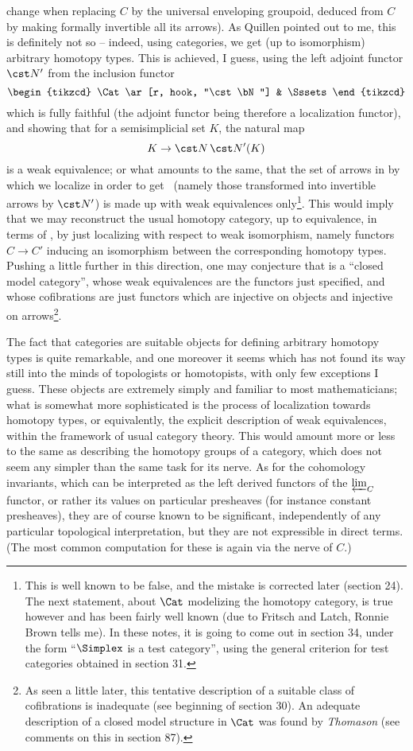 change when replacing $C$ by the universal enveloping groupoid,
deduced from $C$ by making formally invertible all its arrows).
As Quillen pointed out to me, this is definitely not so -- indeed,
using categories, we get (up to isomorphism) arbitrary homotopy
types. This is achieved, I guess, using the left adjoint functor $\cst
N'$ from the inclusion functor
\[ \begin{tikzcd} \Cat \ar[r, hook, "\cst \bN"] & \Sssets\end{tikzcd}\]
which is fully faithful (the adjoint functor being therefore a
localization functor), and showing that for a semisimplicial set $K$,
the natural map
\[ K \to \cst N\,\cst N' (K) \]
is a weak equivalence; or what amounts to the same, that the set of
arrows in \Sssets{} by which we localize in order to get \Cat\ (namely
those transformed into invertible arrows by $\cst N'$) is made up with
weak equivalences only\footnote{This is well known to be false, and the mistake is corrected later (section 24). The next statement, about $\Cat$ modelizing the homotopy category, is true however and has been fairly well known (due to Fritsch and Latch, Ronnie Brown tells me). In these notes, it is going to come out in section 34, under the form ``$\Simplex$ is a test category'', using the general criterion for test categories obtained in section 31.}. This would imply
that we may reconstruct the usual homotopy category, up to
equivalence, in terms of \Cat, by just localizing \Cat{}
with respect to weak isomorphism, namely functors $C \to C'$ inducing
an isomorphism between the corresponding homotopy types. Pushing a
little further in this direction, one may conjecture that \Cat{} is a
``closed model category'', whose weak equivalences are the functors
just specified, and whose cofibrations are just functors which are
injective on objects and injective on arrows\footnote{As seen a little later, this tentative description of a suitable class of cofibrations is inadequate (see beginning of section 30). An adequate description of a closed model structure in $\Cat$ was found by \emph{Thomason} (see comments on this in section 87).}.

The fact that categories are suitable objects for defining arbitrary homotopy types is quite remarkable, and one moreover it seems which has
not found its way still into the minds of topologists or homotopists,
with only few exceptions I guess. These objects are extremely simply
and familiar to most mathematicians; what is somewhat more
sophisticated is the process of localization towards homotopy types,
or equivalently, the explicit description of weak equivalences, within
the framework of usual category theory. This would amount more or less
to the same as describing the homotopy groups of a category, which
does not seem any simpler than the same task for its nerve. As for the
cohomology invariants, which can be interpreted as the left derived
functors of the $\varprojlim_C$ functor, or rather its values on
particular presheaves (for instance constant presheaves), they are of
course known to be significant, independently of any particular
topological interpretation, but they are not expressible in direct
terms. (The most common computation for these is again via the nerve
of $C$.)

